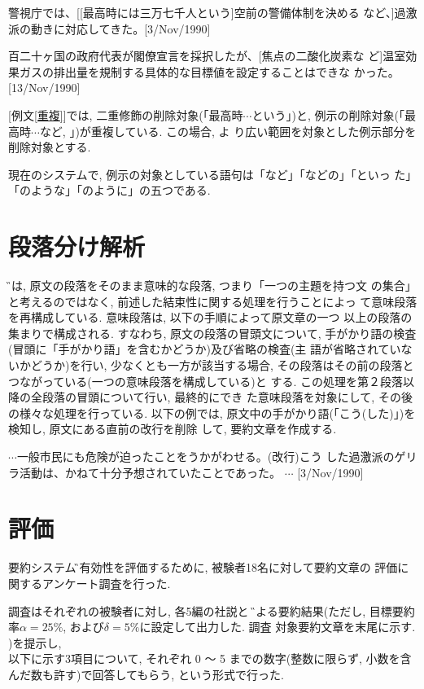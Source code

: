 \begin{sample}
\item 警視庁では、[[最高時には三万七千人という]空前の警備体制を決める
など、]過激派の動きに対応してきた。[3/Nov/1990]\label{重複}
\item 百二十ヶ国の政府代表が閣僚宣言を採択したが、[焦点の二酸化炭素な
ど]温室効果ガスの排出量を規制する具体的な目標値を設定することはできな
かった。[13/Nov/1990]
\end{sample}

[例文\ref{重複}]では, 二重修飾の削除対象(「最高時$\cdots$という」)と,
 例示の削除対象(「最高時$\cdots$など, 」)が重複している. この場合, よ
り広い範囲を対象とした例示部分を削除対象とする.

現在のシステムで, 例示の対象としている語句は「など」「などの」「といっ
た」「のような」「のように」の五つである.


\section{段落分け解析}\label{段落分け}
 \G では, 原文の段落をそのまま意味的な段落, つまり「一つの主題を持つ文
の集合」と考えるのではなく, 前述した結束性に関する処理を行うことによっ
て意味段落を再構成している. 意味段落は, 以下の手順によって原文章の一つ
以上の段落の集まりで構成される. すなわち, 原文の段落の冒頭文について, 
手がかり語の検査(冒頭に「手がかり語」を含むかどうか)及び省略の検査(主
語が省略されていないかどうか)を行い, 少なくとも一方が該当する場合, 
その段落はその前の段落とつながっている(一つの意味段落を構成している)と
する. この処理を第２段落以降の全段落の冒頭について行い, 最終的にでき
た意味段落を対象にして, その後の様々な処理を行っている. 以下の例では, 
原文中の手がかり語(「こう(した)」)を検知し, 原文にある直前の改行を削除
して, 要約文章を作成する. 

\begin{sample}
\item $\cdots$一般市民にも危険が迫ったことをうかがわせる。(改行)こう
した過激派のゲリラ活動は、かねて十分予想されていたことであった。
$\cdots$ [3/Nov/1990]
\end{sample}


\section{評価}\label{評価}
要約システム\G の有効性を評価するために, 被験者18名に対して要約文章の
評価に関するアンケート調査を行った. 

調査はそれぞれの被験者に対し, 各5編の社説と \G による要約結果(ただし, 
目標要約率$\alpha=25 \%$, および$\delta=5 \%$に設定して出力した. 調査
対象要約文章を末尾に示す. )を提示し,\\以下に示す3項目について, それぞれ
0 〜 5 までの数字(整数に限らず, 小数を含んだ数も許す)で回答してもらう, 
という形式で行った. 


